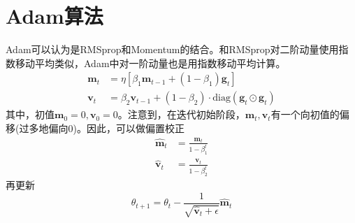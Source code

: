 \section{Adam算法}
Adam可以认为是RMSprop和Momentum的结合。和RMSprop对二阶动量使用指数移动平均类似，Adam中对一阶动量也是用指数移动平均计算。
\begin{equation}
	\begin{aligned}
		\boldsymbol{m}_t&=\eta [\beta_1 \boldsymbol{m}_{t-1} + (1-\beta_1)  \boldsymbol{g}_t]\\
		\boldsymbol{v}_t &= \beta_2 \boldsymbol{v}_{t-1} + (1-\beta_2)\cdot \mathrm{diag}(\boldsymbol{g}_t \odot \boldsymbol{g}_t) 
	\end{aligned}
\end{equation}
其中，初值$\boldsymbol{m}_0=0,\boldsymbol{v}_0=0$。注意到，在迭代初始阶段，$\boldsymbol{m}_t,\boldsymbol{v}_t$有一个向初值的偏移(过多地偏向0)。因此，可以做偏置校正
\begin{equation}
\begin{aligned}
	\hat{\boldsymbol{m}}_t&=\frac{\boldsymbol{m}_t}{1-\beta_1^t}\\
	\hat{\boldsymbol{v}}_t &=  \frac{\boldsymbol{v}_t}{1-\beta_2^t}
\end{aligned}
\end{equation}
再更新
\begin{equation}
	\theta_{t+1} = \theta_{t} - \frac{1}{\sqrt{\hat{\boldsymbol{v}}_t + \epsilon}}\hat{\boldsymbol{m}}_t
\end{equation}